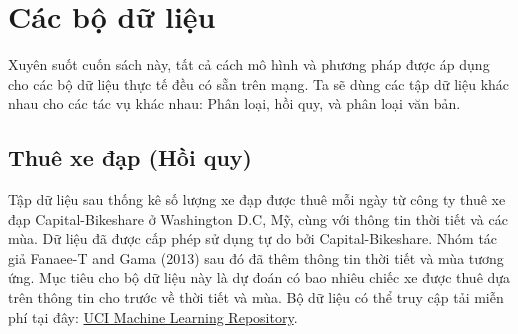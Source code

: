 \chapter{Các bộ dữ liệu}

Xuyên suốt cuốn sách này, tất cả cách mô hình và phương pháp được áp dụng cho các bộ dữ liệu thực tế đều có sẵn trên mạng. Ta sẽ dùng các tập dữ liệu khác nhau cho các tác vụ khác nhau: Phân loại, hồi quy, và phân loại văn bản.

\section{Thuê xe đạp (Hồi quy)}\label{chap_3.1}
Tập dữ liệu sau thống kê số lượng xe đạp được thuê mỗi ngày từ công ty thuê xe đạp Capital-Bikeshare ở Washington D.C, Mỹ, cùng với thông tin thời tiết và các mùa. Dữ liệu đã được cấp phép sử dụng tự do bởi Capital-Bikeshare. Nhóm tác giả Fanaee-T and Gama (2013) sau đó đã thêm thông tin thời tiết và mùa tương ứng. Mục tiêu cho bộ dữ liệu này là dự đoán có bao nhiêu chiếc xe được thuê dựa trên thông tin cho trước về thời tiết và mùa. Bộ dữ liệu có thể truy cập tải miễn phí tại đây: \href{http://archive.ics.uci.edu/ml/datasets/Bike+Sharing+Dataset}{UCI Machine Learning Repository}. 

